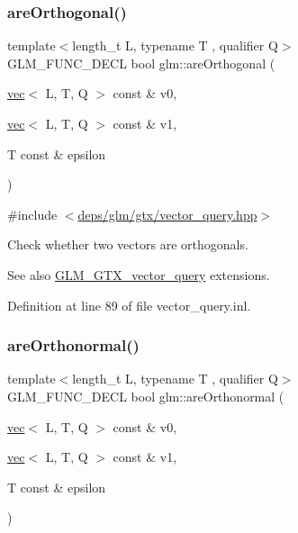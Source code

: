 \subsubsection{\texorpdfstring{are\+Orthogonal()}{areOrthogonal()}}
{\footnotesize\ttfamily template$<$length\+\_\+t L, typename T , qualifier Q$>$ \\
G\+L\+M\+\_\+\+F\+U\+N\+C\+\_\+\+D\+E\+CL bool glm\+::are\+Orthogonal (\begin{DoxyParamCaption}\item[{\hyperlink{structglm_1_1vec}{vec}$<$ L, T, Q $>$ const \&}]{v0,  }\item[{\hyperlink{structglm_1_1vec}{vec}$<$ L, T, Q $>$ const \&}]{v1,  }\item[{T const \&}]{epsilon }\end{DoxyParamCaption})}



{\ttfamily \#include $<$\hyperlink{vector__query_8hpp}{deps/glm/gtx/vector\+\_\+query.\+hpp}$>$}

Check whether two vectors are orthogonals. \begin{DoxySeeAlso}{See also}
\hyperlink{group__gtx__vector__query}{G\+L\+M\+\_\+\+G\+T\+X\+\_\+vector\+\_\+query} extensions. 
\end{DoxySeeAlso}


Definition at line 89 of file vector\+\_\+query.\+inl.

\mbox{\label{group__gtx__vector__query_ga1b091c3d7f9ee3b0708311c001c293e3}} 
\subsubsection{\texorpdfstring{are\+Orthonormal()}{areOrthonormal()}}
{\footnotesize\ttfamily template$<$length\+\_\+t L, typename T , qualifier Q$>$ \\
G\+L\+M\+\_\+\+F\+U\+N\+C\+\_\+\+D\+E\+CL bool glm\+::are\+Orthonormal (\begin{DoxyParamCaption}\item[{\hyperlink{structglm_1_1vec}{vec}$<$ L, T, Q $>$ const \&}]{v0,  }\item[{\hyperlink{structglm_1_1vec}{vec}$<$ L, T, Q $>$ const \&}]{v1,  }\item[{T const \&}]{epsilon }\end{DoxyParamCaption})}



